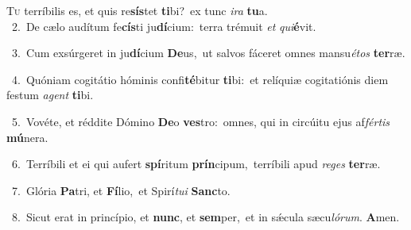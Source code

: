 \lettrine{\initial\textcolor{\initialcolor}{T}}{u} terríbilis es, et quis re\-\textbf{sís}\-tet \textbf{ti}\-bi?~\star ex tunc \textit{i}\-\textit{ra} \textbf{tu}\-a.\\
{\numbfont\textcolor{\numbcolor}{~2.}}~De cælo audítum fe\-\textbf{cís}\-ti ju\-\textbf{dí}\-cium:~\star terra trémuit \textit{et} \textit{qui}\-\textbf{é}vit.\par
{\numbfont\textcolor{\numbcolor}{~3.}}~Cum exsúrgeret in ju\-\textbf{dí}\-cium \textbf{De}\-us,~\star ut salvos fáceret omnes mansu\-\textit{é}\-\textit{tos} \textbf{ter}\-ræ.\par
{\numbfont\textcolor{\numbcolor}{~4.}}~Quóniam cogitátio hóminis confi\-\textbf{té}\-bitur \textbf{ti}\-bi:~\star et relíquiæ cogitatiónis diem festum \textit{a}\-\textit{gent} \textbf{ti}\-bi.\par
{\numbfont\textcolor{\numbcolor}{~5.}}~Vovéte, et réddite Dómino \textbf{De}\-o \textbf{ves}\-tro:~\star omnes, qui in circúitu ejus af\-\textit{fér}\-\textit{tis} \textbf{mú}\-nera.\par
{\numbfont\textcolor{\numbcolor}{~6.}}~Terríbili et ei qui aufert \textbf{spí}\-ritum \textbf{prín}\-cipum,~\star terríbili apud \textit{re}\-\textit{ges} \textbf{ter}\-ræ.\par
{\numbfont\textcolor{\numbcolor}{~7.}}~Glória \textbf{Pa}\-tri, et \textbf{Fí}\-lio,~\star et Spirí\-\textit{tu}\-\textit{i} \textbf{Sanc}\-to.\par
{\numbfont\textcolor{\numbcolor}{~8.}}~Sicut erat in princípio, et \textbf{nunc}\-, et \textbf{sem}\-per,~\star et in sǽcula sæcu\-\textit{ló}\-\textit{rum}. \textbf{A}\-men.\par
